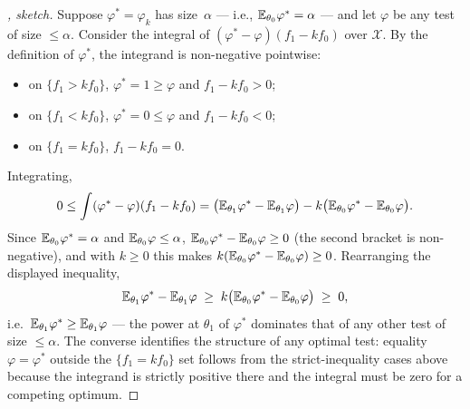 \begin{proof}[, sketch]
Suppose $\varphi^* = \varphi_k$ has size~$\alpha$ — i.e.,
$\mathbb{E}_{\theta_0} \varphi^* = \alpha$ — and let $\varphi$ be any test
of size $\leq \alpha$. Consider the integral of
$(\varphi^* - \varphi)(f_1 - k f_0)$ over $\mathcal{X}$. By the
definition of $\varphi^*$, the integrand is non-negative pointwise:
\begin{itemize}
  \item on $\{f_1 > k f_0\}$, $\varphi^* = 1 \geq \varphi$ and $f_1 - k f_0 > 0$;
  \item on $\{f_1 < k f_0\}$, $\varphi^* = 0 \leq \varphi$ and $f_1 - k f_0 < 0$;
  \item on $\{f_1 = k f_0\}$, $f_1 - k f_0 = 0$.
\end{itemize}
Integrating,
\[
  0 \leq \int (\varphi^* - \varphi)(f_1 - k f_0) = \bigl(\mathbb{E}_{\theta_1} \varphi^* - \mathbb{E}_{\theta_1} \varphi\bigr) - k \bigl(\mathbb{E}_{\theta_0} \varphi^* - \mathbb{E}_{\theta_0} \varphi\bigr).
\]
Since $\mathbb{E}_{\theta_0} \varphi^* = \alpha$ and $\mathbb{E}_{\theta_0} \varphi \leq \alpha$,
$\mathbb{E}_{\theta_0} \varphi^* - \mathbb{E}_{\theta_0} \varphi \geq 0$ (the second
bracket is non-negative), and with $k \geq 0$ this makes
$k(\mathbb{E}_{\theta_0} \varphi^* - \mathbb{E}_{\theta_0} \varphi) \geq 0$.
Rearranging the displayed inequality,
\[
  \mathbb{E}_{\theta_1} \varphi^* - \mathbb{E}_{\theta_1} \varphi \;\geq\; k\bigl(\mathbb{E}_{\theta_0} \varphi^* - \mathbb{E}_{\theta_0} \varphi\bigr) \;\geq\; 0,
\]
i.e.\ $\mathbb{E}_{\theta_1} \varphi^* \geq \mathbb{E}_{\theta_1} \varphi$ — the
power at $\theta_1$ of $\varphi^*$ dominates that of any other test
of size $\leq \alpha$. The converse identifies the structure of any
optimal test: equality $\varphi = \varphi^*$ outside the
$\{f_1 = k f_0\}$ set follows from the strict-inequality cases above
because the integrand is strictly positive there and the integral
must be zero for a competing optimum.
\end{proof}

